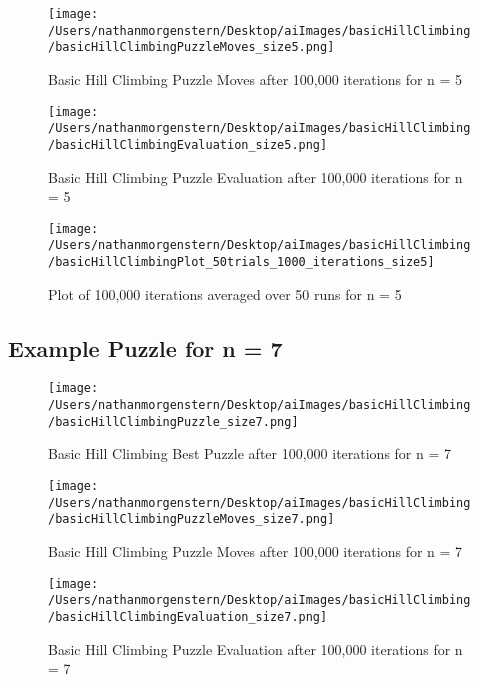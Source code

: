 \documentclass{report}
\begin{document}
	\begin{figure}[H]
	\centering
	\texttt{[image: /Users/nathanmorgenstern/Desktop/aiImages/basicHillClimbing/basicHillClimbingPuzzleMoves\_size5.png]}
	\caption{Basic Hill Climbing Puzzle Moves  after 100,000 iterations for n = 5} 
	\label{fig: Basic Hill Climbing Puzzle Moves after 100,000 iterations for n = 5}
	\end{figure}

	\begin{figure}[H]
	\centering
	\texttt{[image: /Users/nathanmorgenstern/Desktop/aiImages/basicHillClimbing/basicHillClimbingEvaluation\_size5.png]}
	\caption{Basic Hill Climbing Puzzle Evaluation after 100,000 iterations for n = 5} 
	\label{fig: Basic Hill Climbing Puzzle Evaluation after 100,000 iterations for n = 5}
	\end{figure}
	
	\begin{figure}[H]
	\centering
	\texttt{[image: /Users/nathanmorgenstern/Desktop/aiImages/basicHillClimbing/basicHillClimbingPlot\_50trials\_1000\_iterations\_size5]}
	\caption{Plot of 100,000 iterations averaged over 50 runs for n = 5} 
	\label{fig: Plot of 100,000 iterations averaged over 50 runs for n = 5}
	\end{figure}

\subsection{Example Puzzle for n = 7}

	\begin{figure}[H]
	\centering
	\texttt{[image: /Users/nathanmorgenstern/Desktop/aiImages/basicHillClimbing/basicHillClimbingPuzzle\_size7.png]}
	\caption{Basic Hill Climbing Best Puzzle after 100,000 iterations for n = 7} 
	\label{fig: Basic Hill Climbing Best Puzzle after 100,000 iterations for n = 7}
	\end{figure}
	
	\begin{figure}[H]
	\centering
	\texttt{[image: /Users/nathanmorgenstern/Desktop/aiImages/basicHillClimbing/basicHillClimbingPuzzleMoves\_size7.png]}
	\caption{Basic Hill Climbing Puzzle Moves  after 100,000 iterations for n = 7} 
	\label{fig: Basic Hill Climbing Puzzle Moves after 100,000 iterations for n = 7}
	\end{figure}

	\begin{figure}[H]
	\centering
	\texttt{[image: /Users/nathanmorgenstern/Desktop/aiImages/basicHillClimbing/basicHillClimbingEvaluation\_size7.png]}
	\caption{Basic Hill Climbing Puzzle Evaluation after 100,000 iterations for n = 7} 
	\label{fig: Basic Hill Climbing Puzzle Evaluation after 100,000 iterations for n = 7}
	\end{figure}
	
\end{document}

